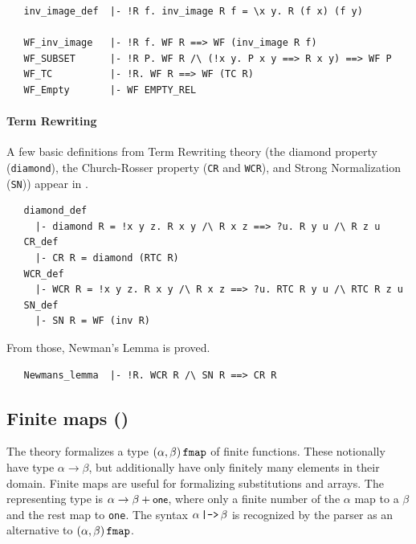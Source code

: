 \begin{hol}
\begin{verbatim}
   inv_image_def  |- !R f. inv_image R f = \x y. R (f x) (f y)

   WF_inv_image   |- !R f. WF R ==> WF (inv_image R f)
   WF_SUBSET      |- !R P. WF R /\ (!x y. P x y ==> R x y) ==> WF P
   WF_TC          |- !R. WF R ==> WF (TC R)
   WF_Empty       |- WF EMPTY_REL
\end{verbatim}
\end{hol}

\paragraph {Term Rewriting}

A few basic definitions from Term Rewriting theory
(the diamond property (\verb+diamond+), the Church-Rosser
property ({\small\verb+CR+} and {\small\verb+WCR+}), and Strong
Normalization ({\small\verb+SN+})) appear
in .
%
\begin{hol}
\begin{verbatim}
   diamond_def
     |- diamond R = !x y z. R x y /\ R x z ==> ?u. R y u /\ R z u
   CR_def
     |- CR R = diamond (RTC R)
   WCR_def
     |- WCR R = !x y z. R x y /\ R x z ==> ?u. RTC R y u /\ RTC R z u
   SN_def
     |- SN R = WF (inv R)
\end{verbatim}
\end{hol}
%
From those, Newman's Lemma is proved.
%
\begin{hol}
\begin{verbatim}
   Newmans_lemma  |- !R. WCR R /\ SN R ==> CR R
\end{verbatim}
\end{hol}

\subsection{Finite maps ()}\label{finite_map}

The theory  formalizes a type
$(\alpha,\beta)\,\holtxt{fmap}$ of finite functions. These notionally
have type $\alpha\to\beta$, but additionally have only finitely many
elements in their domain. Finite maps are useful for formalizing
substitutions and arrays. The representing type is $\alpha\to\beta +
\mbox{\small{\textbf{\sf{one}}}}$, where only a finite number of the $\alpha$ map to a
$\beta$ and the rest map to \verb+one+. The syntax
$\alpha\,\holtxt{|->}\,\beta$ is recognized by the parser as an
alternative to $(\alpha,\beta)\,\holtxt{fmap}$.

